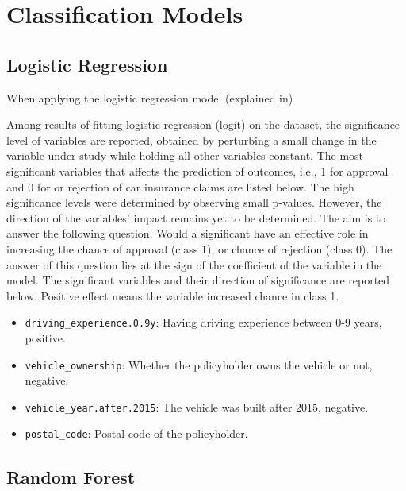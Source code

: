 \documentclass{article}
\providecommand{\tightlist}{%
  \setlength{\itemsep}{0pt}\setlength{\parskip}{0pt}}
\begin{document}
\hypertarget{classification-models}{%
\section{Classification Models}\label{classification-models}}

\hypertarget{logistic-regression}{%
\subsection{\texorpdfstring{Logistic Regression
\label{subsec:logit}}{Logistic Regression }}\label{logistic-regression}}

When applying the logistic regression model (explained in)

Among results of fitting logistic regression (logit) on the dataset, the
significance level of variables are reported, obtained by perturbing a
small change in the variable under study while holding all other
variables constant. The most significant variables that affects the
prediction of outcomes, i.e., 1 for approval and 0 for or rejection of
car insurance claims are listed below. The high significance levels were
determined by observing small p-values. However, the direction of the
variables' impact remains yet to be determined. The aim is to answer the
following question. Would a significant have an effective role in
increasing the chance of approval (class 1), or chance of rejection
(class 0). The answer of this question lies at the sign of the
coefficient of the variable in the model. The significant variables and
their direction of significance are reported below. Positive effect
means the variable increased chance in class 1.

\begin{itemize}
\tightlist
\item
  \texttt{driving\_experience.0.9y}: Having driving experience between
  0-9 years, positive.
\item
  \texttt{vehicle\_ownership}: Whether the policyholder owns the vehicle
  or not, negative.
\item
  \texttt{vehicle\_year.after.2015}: The vehicle was built after 2015,
  negative.
\item
  \texttt{postal\_code}: Postal code of the policyholder.
\end{itemize}

\hypertarget{random-forest}{%
\subsection{\texorpdfstring{Random Forest
\label{subsec:rf}}{Random Forest }}\label{random-forest}}
\end{document}

